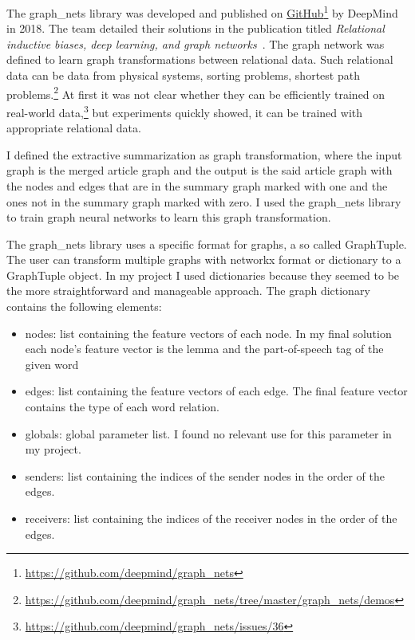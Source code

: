 The graph\_nets library was developed and published on \href{https://github.com/deepmind/graph_nets}{GitHub}\footnote{\url{https://github.com/deepmind/graph_nets}} by DeepMind in 2018. The team detailed their solutions in the publication titled \textit{Relational inductive biases, deep learning, and graph networks}~\cite{GraphNet}. The graph network was defined to learn graph transformations between relational data. Such relational data can be data from physical systems, sorting problems, shortest path problems.\footnote{\url{https://github.com/deepmind/graph_nets/tree/master/graph_nets/demos}} At first it was not clear whether they can be efficiently trained on real-world data,\footnote{\url{https://github.com/deepmind/graph\_nets/issues/36}} but experiments quickly showed, it can be trained with appropriate relational data.

I defined the extractive summarization as graph transformation, where the input graph is the merged article graph and the output is the said article graph with the nodes and edges that are in the summary graph marked with one and the ones not in the summary graph marked with zero. I used the graph\_nets library to train graph neural networks to learn this graph transformation.
	
The graph\_nets library uses a specific format for graphs, a so called GraphTuple. The user can transform multiple graphs with networkx format or dictionary	 to a GraphTuple object. In my project I used dictionaries because they seemed to be the more straightforward and manageable approach.
The graph dictionary contains the following elements:
\begin{itemize}
	\item nodes: list containing the feature vectors of each node. In my final solution each node's feature vector is the lemma and the part-of-speech tag of the given word 
	\item edges: list containing the feature vectors of each edge. The final feature vector contains the type of each word relation.
	\item globals: global parameter list. I found no relevant use for this parameter in my project.
	\item senders: list containing the indices of the sender nodes in the order of the edges.
	\item receivers: list containing the indices of the receiver nodes in the order of the edges.
\end{itemize}

